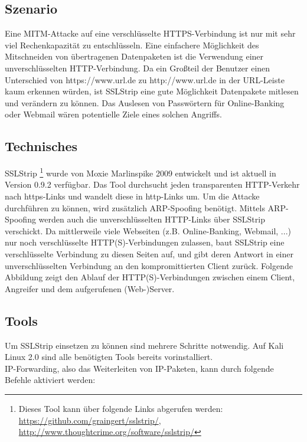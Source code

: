 \subsection*{Szenario}
Eine MITM-Attacke auf eine verschlüsselte HTTPS-Verbindung ist nur mit sehr viel Rechenkapazität zu entschlüsseln. Eine einfachere Möglichkeit des Mitschneiden von übertragenen Datenpaketen ist die Verwendung einer unverschlüsselten HTTP-Verbindung. Da ein Großteil der Benutzer einen Unterschied von https://www.url.de zu http://www.url.de in der URL-Leiste kaum erkennen würden, ist SSLStrip eine gute Möglichkeit Datenpakete mitlesen und verändern zu können. \newline
Das Auslesen von Passwörtern für Online-Banking oder Webmail wären potentielle Ziele eines solchen Angriffs.

\subsection*{Technisches}
SSLStrip \footnote{ Dieses Tool kann über folgende Links abgerufen werden: \url{https://github.com/graingert/sslstrip/}, \url{http://www.thoughtcrime.org/software/sslstrip/}} wurde von Moxie Marlinspike 2009 entwickelt und ist aktuell in Version 0.9.2 verfügbar. Das Tool durchsucht jeden transparenten HTTP-Verkehr nach https-Links und wandelt diese in http-Links um. Um die Attacke durchführen zu können, wird zusätzlich ARP-Spoofing benötigt. Mittels ARP-Spoofing werden auch die unverschlüsselten HTTP-Links über SSLStrip verschickt. Da mittlerweile viele Webseiten (z.B. Online-Banking, Webmail, ...) nur noch verschlüsselte HTTP(S)-Verbindungen zulassen, baut SSLStrip eine verschlüsselte Verbindung zu diesen Seiten auf, und gibt deren Antwort in einer unverschlüsselten Verbindung an den kompromittierten Client zurück. Folgende Abbildung zeigt den Ablauf der HTTP(S)-Verbindungen zwischen einem Client, Angreifer und dem aufgerufenen (Web-)Server. \\

\subsection*{Tools}
Um SSLStrip einsetzen zu können sind mehrere Schritte notwendig. Auf Kali Linux 2.0 sind alle benötigten Tools bereits vorinstalliert. \\

IP-Forwarding, also das Weiterleiten von IP-Paketen, kann durch folgende Befehle aktiviert werden:\\

